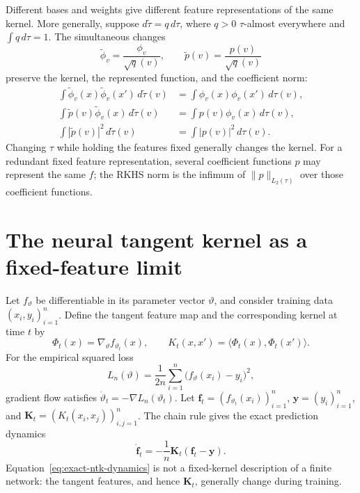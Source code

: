 \documentclass[11pt,twoside]{article}
\theoremstyle{definition}
\theoremstyle{remark}
\begin{document}
Different bases and weights give different feature representations of the
same kernel. More generally, suppose $d\widetilde\tau=q\,d\tau$, where
$q>0$ $\tau$-almost everywhere and $\int q\,d\tau=1$. The simultaneous
changes
\begin{equation}
 \widetilde\phi_v=\frac{\phi_v}{\sqrt q(v)},
 \qquad
 \widetilde p(v)=\frac{p(v)}{\sqrt q(v)}
 \label{eq:feature-measure-change}
\end{equation}
preserve the kernel, the represented function, and the coefficient norm:
\begin{align*}
 \int\widetilde\phi_v(x)\widetilde\phi_v(x')\,d\widetilde\tau(v)
 &=\int\phi_v(x)\phi_v(x')\,d\tau(v),\\
 \int\widetilde p(v)\widetilde\phi_v(x)\,d\widetilde\tau(v)
 &=\int p(v)\phi_v(x)\,d\tau(v),\\
 \int|\widetilde p(v)|^2\,d\widetilde\tau(v)
 &=\int|p(v)|^2\,d\tau(v).
\end{align*}
Changing $\tau$ while holding the features fixed generally changes the
kernel. For a redundant fixed feature representation, several coefficient
functions $p$ may represent the same $f$; the RKHS norm is the infimum of
$\|p\|_{L_2(\tau)}$ over those coefficient functions.

\section{The neural tangent kernel as a fixed-feature limit}
\label{app:ntk}

Let $f_\vartheta$ be differentiable in its parameter vector $\vartheta$, and
consider training data $(x_i,y_i)_{i=1}^n$. Define the tangent feature map and
the corresponding kernel at time $t$ by
\begin{equation}
 \Phi_t(x)=\nabla_\vartheta f_{\vartheta_t}(x),
 \qquad
 K_t(x,x')=\langle\Phi_t(x),\Phi_t(x')\rangle.
 \label{eq:time-dependent-ntk}
\end{equation}
For the empirical squared loss
\begin{equation}
 L_n(\vartheta)=\frac1{2n}\sum_{i=1}^n
 \bigl(f_\vartheta(x_i)-y_i\bigr)^2,
 \label{eq:ntk-empirical-loss}
\end{equation}
gradient flow satisfies $\dot\vartheta_t=-\nabla L_n(\vartheta_t)$. Let
$\mathbf f_t=(f_{\vartheta_t}(x_i))_{i=1}^n$,
$\mathbf y=(y_i)_{i=1}^n$, and
$\mathbf K_t=(K_t(x_i,x_j))_{i,j=1}^n$. The chain rule gives the exact
prediction dynamics
\begin{equation}
 \dot{\mathbf f}_t
 =-\frac1n\mathbf K_t(\mathbf f_t-\mathbf y).
 \label{eq:exact-ntk-dynamics}
\end{equation}
Equation~\eqref{eq:exact-ntk-dynamics} is not a fixed-kernel description of a
finite network: the tangent features, and hence $\mathbf K_t$, generally
change during training.
\end{document}
